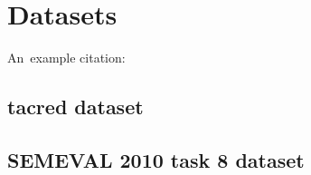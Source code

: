 \chapter{Datasets}

An~example citation: \cite{Andel07}

\section{tacred dataset}

\section{SEMEVAL 2010 task 8 dataset}
